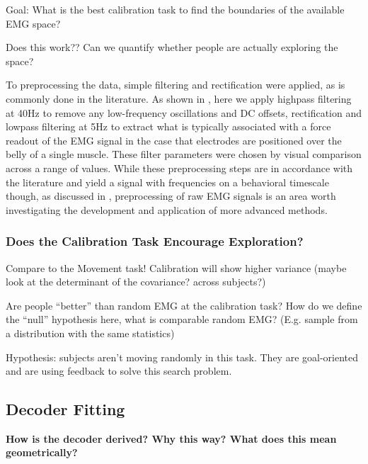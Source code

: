 \documentclass[../main.tex]{subfiles}
\begin{document}
Goal: What is the best calibration task to find the boundaries of the available EMG space? 

Does this work?? Can we quantify whether people are actually exploring the space?

To preprocessing the data, simple filtering and rectification were applied, as is commonly done in the literature\cite{@sangerBayesianFilteringMyoelectric2007;@churchlandNeuralPopulationDynamics2012a;@churchlandNeuralVariabilityPremotor2006;@sussillo2015}. As shown in , here we apply highpass filtering at 40Hz to remove any low-frequency oscillations and DC offsets, rectification and lowpass filtering at 5Hz to extract what is typically associated with a force readout of the EMG signal in the case that electrodes are positioned over the belly of a single muscle. These filter parameters were chosen by visual comparison across a range of values. While these preprocessing steps are in accordance with the literature and yield a signal with frequencies on a behavioral timescale though, as discussed in , preprocessing of raw EMG signals is an area worth investigating the development and application of more advanced methods.



\subsubsection{Does the Calibration Task Encourage Exploration?}

Compare to the Movement task! Calibration will show higher variance (maybe look at the determinant of the covariance? across subjects?)

Are people “better” than random EMG at the calibration task? How do we define the “null” hypothesis here, what is comparable random EMG? (E.g. sample from a distribution with the same statistics)

Hypothesis: subjects aren’t moving randomly in this task. They are goal-oriented and are using feedback to solve this search problem.
  
  
 
\subsection{Decoder Fitting}\label{sec:decoder_fitting}

\textbf{How is the decoder derived? Why this way? What does this mean geometrically?}
\end{document}
